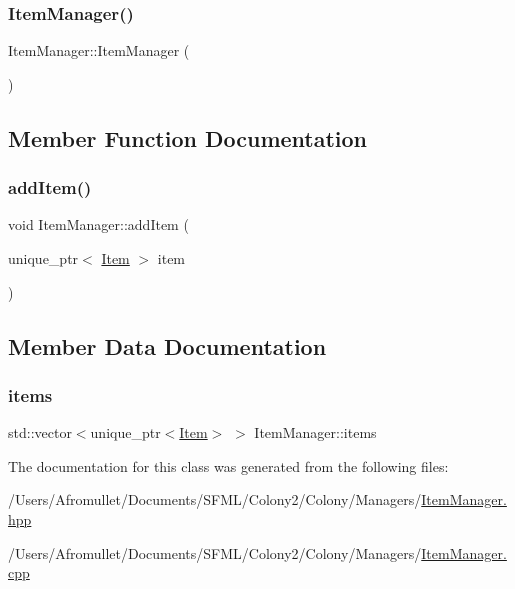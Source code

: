 \subsubsection{\texorpdfstring{Item\+Manager()}{ItemManager()}}
{\footnotesize\ttfamily Item\+Manager\+::\+Item\+Manager (\begin{DoxyParamCaption}{ }\end{DoxyParamCaption})}



\subsection{Member Function Documentation}
\mbox{\label{class_item_manager_af86e2b751da18d6d142c29f8c4860323}} 
\subsubsection{\texorpdfstring{add\+Item()}{addItem()}}
{\footnotesize\ttfamily void Item\+Manager\+::add\+Item (\begin{DoxyParamCaption}\item[{unique\+\_\+ptr$<$ \mbox{\hyperlink{class_item}{Item}} $>$}]{item }\end{DoxyParamCaption})}



\subsection{Member Data Documentation}
\mbox{\label{class_item_manager_a67bf78a9baf31874b6cd6309e0d86e1e}} 
\subsubsection{\texorpdfstring{items}{items}}
{\footnotesize\ttfamily std\+::vector$<$unique\+\_\+ptr$<$\mbox{\hyperlink{class_item}{Item}}$>$ $>$ Item\+Manager\+::items}



The documentation for this class was generated from the following files\+:\begin{DoxyCompactItemize}
\item 
/\+Users/\+Afromullet/\+Documents/\+S\+F\+M\+L/\+Colony2/\+Colony/\+Managers/\mbox{\hyperlink{_item_manager_8hpp}{Item\+Manager.\+hpp}}\item 
/\+Users/\+Afromullet/\+Documents/\+S\+F\+M\+L/\+Colony2/\+Colony/\+Managers/\mbox{\hyperlink{_item_manager_8cpp}{Item\+Manager.\+cpp}}\end{DoxyCompactItemize}
